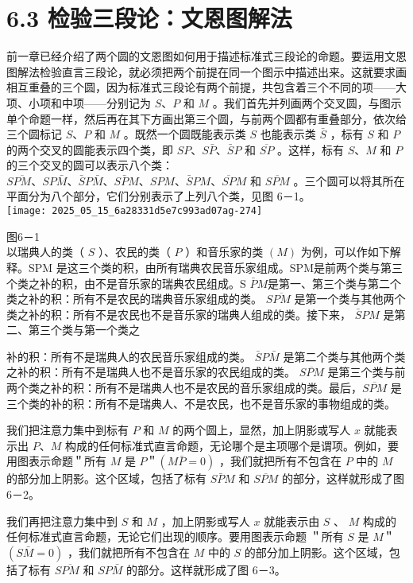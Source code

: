 \section*{6.3 检验三段论：文恩图解法}
前一章已经介绍了两个圆的文恩图如何用于描述标准式三段论的命题。要运用文恩图解法检验直言三段论，就必须把两个前提在同一个图示中描述出来。这就要求画相互重叠的三个圆，因为标准式三段论有两个前提，共包含着三个不同的项——大项、小项和中项——分别记为 $S 、 P$ 和 $M$ 。我们首先并列画两个交叉圆，与图示单个命题一样，然后再在其下方画出第三个圆，与前两个圆都有重叠部分，依次给三个圆标记 $S 、 P$ 和 $M$ 。既然一个圆既能表示类 $S$ 也能表示类 $\bar{S}$ ，标有 $S$ 和 $P$ 的两个交叉的圆能表示四个类，即 $S P 、 S \bar{P} 、 \bar{S} P$ 和 $\overline{S P}$ 。这样，标有 $S 、 M$ 和 $P$ 的三个交叉的圆可以表示八个类：$S \overline{P M} 、 S P \bar{M} 、 \bar{S} P \bar{M} 、 S \bar{P} M 、 S P M 、 \bar{S} P M 、 \overline{S P} M$ 和 $\overline{S P M}$ 。三个圆可以将其所在平面分为八个部分，它们分别表示了上列八个类，见图 6－1。\\
\texttt{[image: 2025\_05\_15\_6a28331d5e7c993ad07ag-274]}

图6－1\\
以瑞典人的类（ $S$ ）、农民的类（ $P$ ）和音乐家的类 $(M)$ 为例，可以作如下解释。SPM 是这三个类的积，由所有瑞典农民音乐家组成。SPM是前两个类与第三个类之补的积，由不是音乐家的瑞典农民组成。S $\bar{P} M$是第一、第三个类与第二个类之补的积：所有不是农民的瑞典音乐家组成的类。 $S \overline{P M}$ 是第一个类与其他两个类之补的积：所有不是农民也不是音乐家的瑞典人组成的类。接下来， $\bar{S} P M$ 是第二、第三个类与第一个类之

补的积：所有不是瑞典人的农民音乐家组成的类。 $\bar{S} P \bar{M}$ 是第二个类与其他两个类之补的积：所有不是瑞典人也不是音乐家的农民组成的类。 $\overline{S P M}$ 是第三个类与前两个类之补的积：所有不是瑞典人也不是农民的音乐家组成的类。最后，$\overline{S P M}$ 是三个类的补的积：所有不是瑞典人、不是农民，也不是音乐家的事物组成的类。

我们把注意力集中到标有 $P$ 和 $M$ 的两个圆上，显然，加上阴影或写人 $x$ 就能表示出 $P 、 M$ 构成的任何标准式直言命题，无论哪个是主项哪个是谓项。例如，要用图表示命题＂所有 $M$ 是 $P$＂$(M \bar{P}=0)$ ，我们就把所有不包含在 $P$ 中的 $M$ 的部分加上阴影。这个区域，包括了标有 $S \bar{P} M$ 和 $\overline{S P M}$ 的部分，这样就形成了图6－2。

我们再把注意力集中到 $S$ 和 $M$ ，加上阴影或写人 $x$ 就能表示由 $S$ 、 $M$ 构成的任何标准式直言命题，无论它们出现的顺序。要用图表示命题 ＂所有 $S$ 是 $M$＂$(S \bar{M}=0)$ ，我们就把所有不包含在 $M$ 中的 $S$ 的部分加上阴影。这个区域，包括了标有 $S \overline{P M}$ 和 $S P \bar{M}$ 的部分。这样就形成了图 6－3。

